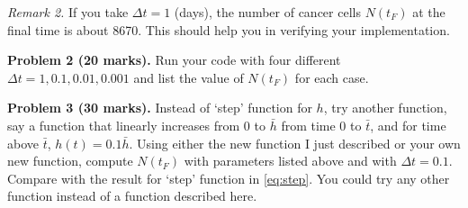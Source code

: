 \documentclass[12pt,a4paper]{report}
\begin{document}
\vspace{10pt}
\textit{Remark 2.} If you take $\Delta t = 1$ (days), the number of cancer cells $N(t_F)$ at the final time is about 8670. This should help you in verifying your implementation.

\vspace{10pt}
\textbf{Problem 2 (20 marks).} Run your code with four different $\Delta t = 1, 0.1, 0.01, 0.001$ and list the value of $N(t_F)$ for each case. 

\vspace{10pt}
\textbf{Problem 3 (30 marks).} Instead of `step' function for $h$, try another function, say a function that linearly increases from $0$ to $\bar{h}$ from time $0$ to $\bar{t}$, and for time above $\bar{t}$, $h(t) = 0.1\bar{h}$. Using either the new function I just described or your own new function, compute $N(t_F)$ with parameters listed above and with $\Delta t = 0.1$. Compare with the result for `step' function in \eqref{eq:step}. You could try any other function instead of a function described here.
 
\end{document}
